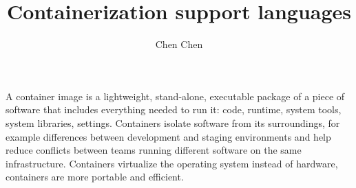 \documentclass[10pt, a4paper]{IEEEtran}
\begin{document}
    \title{Containerization support languages}
    \author{Chen Chen}
    \maketitle
    A container image is a lightweight, stand-alone, executable package of a piece of software that includes everything needed to run it: code, runtime, system tools, system libraries, settings.  Containers isolate software from its surroundings, for example differences between development and staging environments and help reduce conflicts between teams running different software on the same infrastructure. Containers virtualize the operating system instead of hardware, containers are more portable and efficient.\cite{docker_2017}
    





    
    
    
\end{document}
